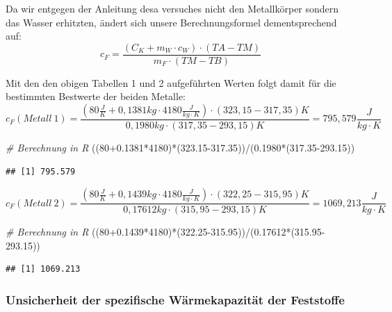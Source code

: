 \documentclass[
  9pt,
]{article}
\newenvironment{Shaded}{\begin{snugshade}}{\end{snugshade}}
\newcommand{\CommentTok}[1]{\textcolor[rgb]{0.56,0.35,0.01}{\textit{#1}}}
\newcommand{\DecValTok}[1]{\textcolor[rgb]{0.00,0.00,0.81}{#1}}
\newcommand{\FloatTok}[1]{\textcolor[rgb]{0.00,0.00,0.81}{#1}}
\newcommand{\NormalTok}[1]{#1}
\newcommand{\SpecialCharTok}[1]{\textcolor[rgb]{0.00,0.00,0.00}{#1}}
\begin{document}
Da wir entgegen der Anleitung desa versuches nicht den Metallkörper
sondern das Wasser erhitzten, ändert sich unsere Berechnungsformel
dementsprechend auf: \begin{equation}\label{Kaloriemeter:c_F}
c_F = \frac{(C_K + m_W\cdot c_W)\cdot  (TA-TM) }{m_F\cdot(TM-TB)}
\end{equation}

Mit den den obigen Tabellen 1 und 2 aufgeführten Werten folgt damit für
die bestimmten Bestwerte der beiden Metalle:
\[c_F(Metall\ 1) = \frac{(80\frac{J}{K}+0,1381kg\cdot 4180\frac{J}{kg\cdot K})\cdot (323,15-317,35) K}{0,1980kg\cdot(317,35-293,15)K}= 795,579\frac{J}{kg\cdot K}\]

\begin{Shaded}
\begin{Highlighting}[]
\CommentTok{\# Berechnung in R}
\NormalTok{((}\DecValTok{80}\FloatTok{+0.1381}\SpecialCharTok{*}\DecValTok{4180}\NormalTok{)}\SpecialCharTok{*}\NormalTok{(}\FloatTok{323.15{-}317.35}\NormalTok{))}\SpecialCharTok{/}\NormalTok{(}\FloatTok{0.1980}\SpecialCharTok{*}\NormalTok{(}\FloatTok{317.35{-}293.15}\NormalTok{))}
\end{Highlighting}
\end{Shaded}

\begin{verbatim}
## [1] 795.579
\end{verbatim}

\[c_F(Metall\ 2) = \frac{(80\frac{J}{K}+0,1439kg\cdot 4180\frac{J}{kg\cdot K})\cdot (322,25-315,95) K}{0,17612kg\cdot(315,95-293,15)K}= 1069,213\frac{J}{kg\cdot K}\]

\begin{Shaded}
\begin{Highlighting}[]
\CommentTok{\# Berechnung in R}
\NormalTok{((}\DecValTok{80}\FloatTok{+0.1439}\SpecialCharTok{*}\DecValTok{4180}\NormalTok{)}\SpecialCharTok{*}\NormalTok{(}\FloatTok{322.25{-}315.95}\NormalTok{))}\SpecialCharTok{/}\NormalTok{(}\FloatTok{0.17612}\SpecialCharTok{*}\NormalTok{(}\FloatTok{315.95{-}293.15}\NormalTok{))}
\end{Highlighting}
\end{Shaded}

\begin{verbatim}
## [1] 1069.213
\end{verbatim}

\hypertarget{unsicherheit-der-spezifische-wuxe4rmekapazituxe4t-der-feststoffe}{%
\subsubsection{Unsicherheit der spezifische Wärmekapazität der
Feststoffe}\label{unsicherheit-der-spezifische-wuxe4rmekapazituxe4t-der-feststoffe}}
\end{document}
